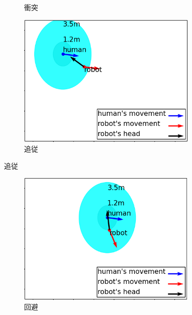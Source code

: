 \documentclass{kuisthesis}
\begin{document}
\begin{itemize}
\begin{figure}[H]
\begin{subfigure}{0.5\textwidth}
    \caption{衝突}
    \label{pic:robot1}
  \end{subfigure}
  \begin{subfigure}{0.5\textwidth}
    \includegraphics[width=0.95\textwidth]{img/simulation2.png}
    \caption{追従}
    \label{pic:robot2}
  \end{subfigure}
\end{figure}
\begin{figure}[H]
  \begin{subfigure}{0.5\textwidth}
    \includegraphics[width=0.95\textwidth]{img/simulation3.png}
    \caption{回避}
    \label{pic:robot3}
  \end{subfigure}
  \begin{subfigure}{0.5\textwidth}

\end{subfigure}
\end{figure}
\end{itemize}
\end{document}
